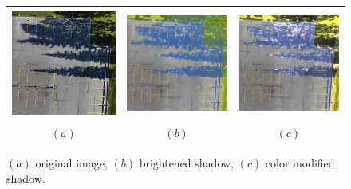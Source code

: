 \documentclass{m2pi}
\begin{document}
\begin{figure}[htp]
\centering
\begin{tabular}{ccc}
\includegraphics[height=3.6cm, width=3.9cm]{figures/Resized_Lot11.jpg}&
\includegraphics[width=3.8cm]{figures/Brightened Shadow.png}&
\includegraphics[width=3.8cm]{figures/Color Modified Shadow.png}\\
$(a)$ & $(b)$ & $(c)$
\end{tabular}
\caption{$(a)$ original image, $(b)$ brightened shadow, $(c)$ color modified shadow.}
\label{lot11shadow}
\end{figure}
\end{document}
